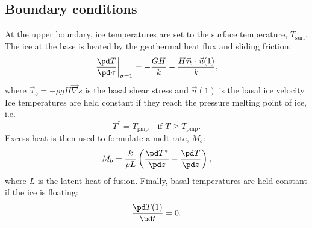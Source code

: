 \subsection{Boundary conditions}
At the upper boundary, ice temperatures are set to the surface temperature, $T_{\text{surf}}$. The ice at the base is heated by the geothermal heat flux and sliding friction:
\begin{equation}
  \left.\frac{\pd T}{\pd\sigma}\right|_{\sigma=1}=-\frac{GH}k-\frac{H\vec{\tau}_b\cdot\vec{u}(1)}k,
\end{equation}
where $\vec{\tau}_b=-\rho gH\vec\nabla s$ is the basal shear stress and $\vec{u}(1)$ is the basal ice velocity. Ice temperatures are held constant if they reach the pressure melting point of ice, i.e.
\begin{equation}
  T^\ast=T_{\text{pmp}} \quad\text{if $T\ge T_{\text{pmp}}$}.
\end{equation}
Excess heat is then used to formulate a melt rate, $M_b$:
\begin{equation}
  \label{temp.eq.meltrate}
  M_b=\frac{k}{\rho L}\left(\frac{\pd T^\ast}{\pd z}-\frac{\pd T}{\pd z}\right),
\end{equation}
where $L$ is the latent heat of fusion. Finally, basal temperatures are held constant if the ice is floating:
\begin{equation}
  \frac{\pd T(1)}{\pd t}  = 0.
\end{equation}


